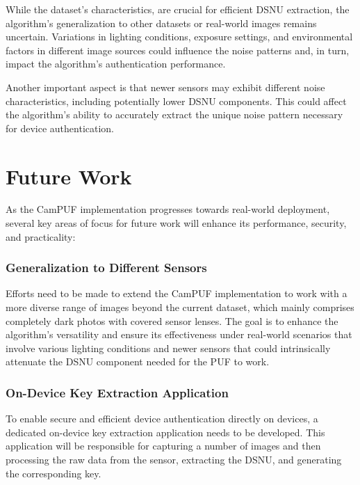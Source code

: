 While the dataset's characteristics, are crucial for efficient DSNU extraction, the algorithm's generalization to other datasets or real-world images remains uncertain. Variations in lighting conditions, exposure settings, and environmental factors in different image sources could influence the noise patterns and, in turn, impact the algorithm's authentication performance. 

Another important aspect is that newer sensors may exhibit different noise characteristics, including potentially lower DSNU components. This could affect the algorithm's ability to accurately extract the unique noise pattern necessary for device authentication.


\section{Future Work}
\label{sec:future_work}

As the CamPUF implementation progresses towards real-world deployment, several key areas of focus for future work will enhance its performance, security, and practicality:

\subsubsection{Generalization to Different Sensors}

Efforts need to be made to extend the CamPUF implementation to work with a more diverse range of images beyond the current dataset, which mainly comprises completely dark photos with covered sensor lenses. The goal is to enhance the algorithm's versatility and ensure its effectiveness under real-world scenarios that involve various lighting conditions and newer sensors that could intrinsically attenuate the DSNU component needed for the PUF to work.

\subsubsection{On-Device Key Extraction Application}

To enable secure and efficient device authentication directly on devices, a dedicated on-device key extraction application needs to be developed. This application will be responsible for capturing a number of images and then processing the raw data from the sensor, extracting the DSNU, and generating the corresponding key.

